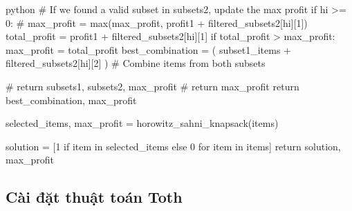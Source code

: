 \begin{mintedbox}{python}
                # If we found a valid subset in subsets2, update the max profit
                if hi >= 0:
                    # max_profit = max(max_profit, profit1 + filtered_subsets2[hi][1])
                    total_profit = profit1 + filtered_subsets2[hi][1]
                    if total_profit > max_profit:
                        max_profit = total_profit
                        best_combination = (
                            subset1_items + filtered_subsets2[hi][2]
                        )  # Combine items from both subsets

            # return subsets1, subsets2, max_profit
            # return max_profit
            return best_combination, max_profit

        selected_items, max_profit = horowitz_sahni_knapsack(items)

        solution = [1 if item in selected_items else 0 for item in items]
        return solution, max_profit
\end{mintedbox}


\subsection{Cài đặt thuật toán Toth}

